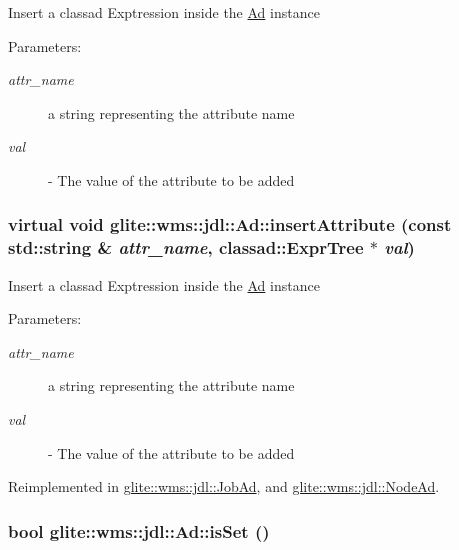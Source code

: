Insert a classad Exptression inside the \hyperlink{classglite_1_1wms_1_1jdl_1_1Ad}{Ad} instance \begin{Desc}
\item[Parameters:]
\begin{description}
\item[{\em attr\_\-name}]a string representing the attribute name \item[{\em val}]- The value of the attribute to be added\end{description}
\end{Desc}
\hypertarget{classglite_1_1wms_1_1jdl_1_1Ad_b2}{
\subsubsection[insertAttribute]{\setlength{\rightskip}{0pt plus 5cm}virtual void glite::wms::jdl::Ad::insert\-Attribute (const std::string \& {\em attr\_\-name}, classad::Expr\-Tree $\ast$ {\em val})}}
\label{classglite_1_1wms_1_1jdl_1_1Ad_b2}


Insert a classad Exptression inside the \hyperlink{classglite_1_1wms_1_1jdl_1_1Ad}{Ad} instance \begin{Desc}
\item[Parameters:]
\begin{description}
\item[{\em attr\_\-name}]a string representing the attribute name \item[{\em val}]- The value of the attribute to be added\end{description}
\end{Desc}


Reimplemented in \hyperlink{classglite_1_1wms_1_1jdl_1_1JobAd_b2}{glite::wms::jdl::Job\-Ad}, and \hyperlink{classglite_1_1wms_1_1jdl_1_1NodeAd_b2}{glite::wms::jdl::Node\-Ad}.\hypertarget{classglite_1_1wms_1_1jdl_1_1Ad_z15_3}{
\subsubsection[isSet]{\setlength{\rightskip}{0pt plus 5cm}bool glite::wms::jdl::Ad::is\-Set ()}}
\label{classglite_1_1wms_1_1jdl_1_1Ad_z15_3}


